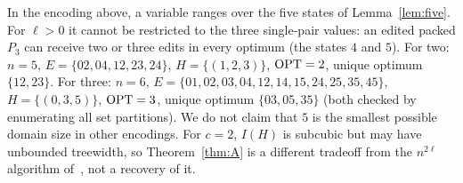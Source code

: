 \begin{remark}\label{rem:domain}
In the encoding above, a variable ranges over the five states of Lemma~\ref{lem:five}. For $\ell>0$ it cannot be restricted to the three single-pair values: an edited packed $P_3$ can receive two or three edits in every optimum (the states $4$ and $5$). For two: $n=5$, $E=\{02,04,12,23,24\}$, $H=\{(1,2,3)\}$, $\mathrm{OPT}=2$, unique optimum $\{12,23\}$. For three: $n=6$, $E=\{01,02,03,04,12,14,15,24,25,35,45\}$, $H=\{(0,3,5)\}$, $\mathrm{OPT}=3$, unique optimum $\{03,05,35\}$ (both checked by enumerating all set partitions). We do not claim that $5$ is the smallest possible domain size in other encodings. For $c=2$, $I(H)$ is subcubic but may have unbounded treewidth, so Theorem~\ref{thm:A} is a different tradeoff from the $n^{2\ell}$ algorithm of~\cite{LPS23}, not a recovery of it.
\end{remark}
